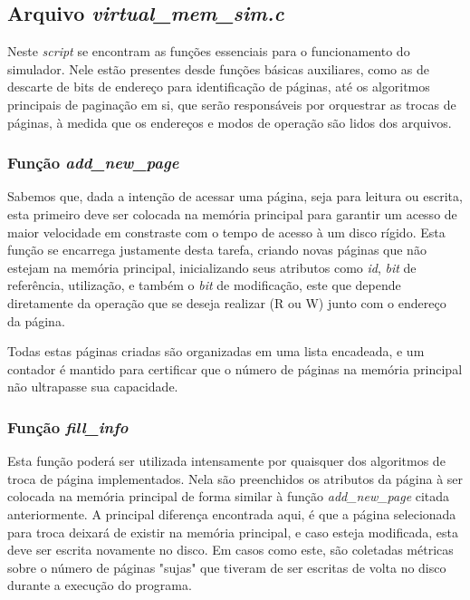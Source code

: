 \documentclass[a4paper, 12pt]{article}
\begin{document}
\subsection{Arquivo \emph{virtual\_mem\_sim.c}}

Neste \emph{script} se encontram as funções essenciais para o funcionamento do simulador. Nele estão presentes desde funções básicas auxiliares, como as de descarte de bits de endereço para identificação de páginas, até os algoritmos principais de paginação em si, que serão responsáveis por orquestrar as trocas de páginas, à medida que os endereços e modos de operação são lidos dos arquivos.

\subsubsection{Função \emph{add\_new\_page}}

Sabemos que, dada a intenção de acessar uma página, seja para leitura ou escrita, esta primeiro deve ser colocada na memória principal para garantir um acesso de maior velocidade em constraste com o tempo de acesso à um disco rígido. Esta função se encarrega justamente desta tarefa, criando novas páginas que não estejam na memória principal, inicializando seus atributos como \emph{id}, \emph{bit} de referência, utilização, e também o \emph{bit} de modificação, este que depende diretamente da operação que se deseja realizar (R ou W) junto com o endereço da página. 

Todas estas páginas criadas são organizadas em uma lista encadeada, e um contador é mantido para certificar que o número de páginas na memória principal não ultrapasse sua capacidade.

\subsubsection{Função \emph{fill\_info}}

Esta função poderá ser utilizada intensamente por quaisquer dos algoritmos de troca de página implementados. Nela são preenchidos os atributos da página à ser colocada na memória principal de forma similar à função \emph{add\_new\_page} citada anteriormente. A principal diferença encontrada aqui, é que a página selecionada para troca deixará de existir na memória principal, e caso esteja modificada, esta deve ser escrita novamente no disco. Em casos como este, são coletadas métricas sobre o número de páginas "sujas" que tiveram de ser escritas de volta no disco durante a execução do programa.
\end{document}

